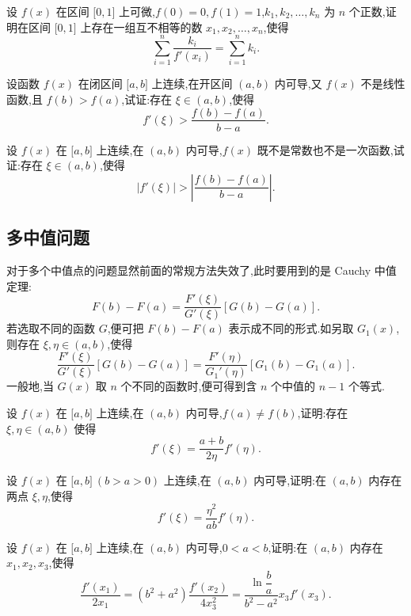 \documentclass[../../数学分析培优讲义.tex]{subfiles}
\begin{document}
\begin{example}
设 $f(x)$ 在区间 $\lbrack 0,1\rbrack$ 上可微,$f(0)=0,f(1)=1$,$k_1,k_2,\ldots,k_n$ 为 $n$ 个正数,证明在区间 $\lbrack 0,1\rbrack$ 上存在一组互不相等的数 $x_1,x_2,\ldots,x_n$,使得
\[
    \sum\limits_{i=1}^n\dfrac{k_i}{f'(x_i)}
    =\sum\limits_{i=1}^n k_i.
\]
\end{example}
\exampleblank

\begin{example}
设函数 $f(x)$ 在闭区间 $\lbrack a,b\rbrack$ 上连续,在开区间 $(a,b)$ 内可导,又 $f(x)$ 不是线性函数,且 $f(b)>f(a)$,试证:存在 $\xi\in(a,b)$,使得
\[
    f'(\xi)>\dfrac{f(b)-f(a)}{b-a}.
\]
\end{example}
\exampleblank

\begin{example}
设 $f(x)$ 在 $\lbrack a,b\rbrack$ 上连续,在 $(a,b)$ 内可导,$f(x)$ 既不是常数也不是一次函数,试证:存在 $\xi\in(a,b)$,使得
\[
    |f'(\xi)|>\left|\dfrac{f(b)-f(a)}{b-a}\right|.
\]
\end{example}
\exampleblank



\subsection{多中值问题}

对于多个中值点的问题显然前面的常规方法失效了,此时要用到的是 Cauchy 中值定理:
\[
    F(b)-F(a)=\dfrac{F'(\xi)}{G'(\xi)}[G(b)-G(a)].
\]
若选取不同的函数 $G$,便可把 $F(b)-F(a)$ 表示成不同的形式.如另取 $G_1(x)$,则存在 $\xi,\eta\in(a,b)$,使得
\[
    \dfrac{F'(\xi)}{G'(\xi)}[G(b)-G(a)]
    =\dfrac{F'(\eta)}{G_1'(\eta)}[G_1(b)-G_1(a)].
\]
一般地,当 $G(x)$ 取 $n$ 个不同的函数时,便可得到含 $n$ 个中值的 $n-1$ 个等式.

\begin{example}
设 $f(x)$ 在 $\lbrack a,b\rbrack$ 上连续,在 $(a,b)$ 内可导,$f(a)\neq f(b)$,证明:存在 $\xi,\eta\in(a,b)$ 使得
\[
    f'(\xi)=\dfrac{a+b}{2\eta}f'(\eta).
\]
\end{example}
\exampleblank

\begin{example}
设 $f(x)$ 在 $\lbrack a,b\rbrack\ (b>a>0)$ 上连续,在 $(a,b)$ 内可导,证明:在 $(a,b)$ 内存在两点 $\xi,\eta$,使得
\[
    f'(\xi)=\dfrac{\eta^2}{ab}f'(\eta).
\]
\end{example}
\exampleblank

\begin{example}
设 $f(x)$ 在 $\lbrack a,b\rbrack$ 上连续,在 $(a,b)$ 内可导,$0<a<b$,证明:在 $(a,b)$ 内存在 $x_1,x_2,x_3$,使得
\[
    \dfrac{f'(x_1)}{2x_1}
    =(b^2+a^2)\dfrac{f'(x_2)}{4x_3^2}
    =\dfrac{\ln\dfrac{b}{a}}{b^2-a^2}x_3f'(x_3).
\]
\end{example}
\exampleblank
\end{document}
